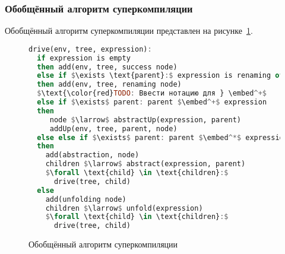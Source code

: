 



\subsubsection{Обобщённый алгоритм суперкомпиляции}

Обобщённый алгоритм суперкомпиляции представлен на рисунке~\ref{fig:scalgogen}.

\begin{figure}[h!]
\begin{lstlisting}[mathescape,language=Haskell,extendedchars=\true,frame=single,basicstyle=\ttfamily]
drive(env, tree, expression):
  if expression is empty
  then add(env, tree, success node)
  else if $\exists \text{parent}:$ expression is renaming of parent
  then add(env, tree, renaming node)
  $\text{\color{red}TODO: Ввести нотацию для } \embed^+$
  else if $\exists$ parent: parent $\embed^+$ expression
  then
     node $\larrow$ abstractUp(expression, parent)
     addUp(env, tree, parent, node)
  else else if $\exists$ parent: parent $\embed^*$ expression
  then
    add(abstraction, node)
    children $\larrow$ abstract(expression, parent)
    $\forall \text{child} \in \text{children}:$
      drive(tree, child)
  else
    add(unfolding node)
    children $\larrow$ unfold(expression)
    $\forall \text{child} \in \text{children}:$
      drive(tree, child)
\end{lstlisting}
\caption{Обобщённый алгоритм суперкомпиляции}
\label{fig:scalgogen}
\end{figure}


